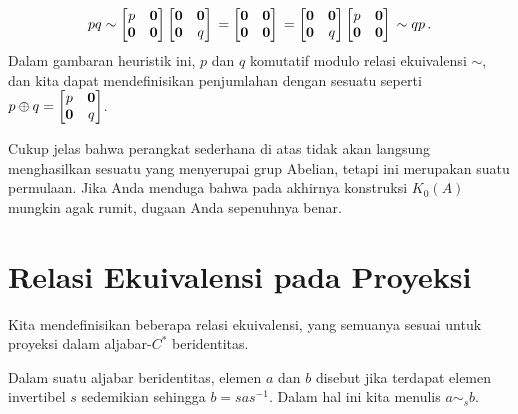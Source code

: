     \[ pq \sim \begin{bmatrix} p & \mathbf{0} \\ \mathbf{0} & \mathbf{0} \end{bmatrix} \begin{bmatrix} \mathbf{0} & \mathbf{0} \\ \mathbf{0} & q \end{bmatrix}  \\
                   = \begin{bmatrix} \mathbf{0} & \mathbf{0} \\ \mathbf{0} & \mathbf{0} \end{bmatrix}           \\
                   =  \begin{bmatrix} \mathbf{0} & \mathbf{0} \\ \mathbf{0} &  q \end{bmatrix}\begin{bmatrix} p & \mathbf{0} \\ \mathbf{0} & \mathbf{0} \end{bmatrix}  \\
                   \sim qp\,. \]
Dalam gambaran heuristik ini, $p$ dan $q$ komutatif modulo relasi ekuivalensi $\sim$, dan kita dapat mendefinisikan penjumlahan dengan sesuatu seperti
$p \oplus q = \begin{bmatrix} p & \mathbf{0} \\ \mathbf{0} & q \end{bmatrix}$.

Cukup jelas bahwa perangkat sederhana di atas tidak akan langsung menghasilkan sesuatu yang menyerupai grup Abelian, tetapi ini merupakan suatu permulaan. Jika Anda menduga
bahwa pada akhirnya konstruksi $K_0(A)$ mungkin agak rumit, dugaan Anda sepenuhnya benar.




\section{Relasi Ekuivalensi pada Proyeksi}

Kita mendefinisikan beberapa relasi ekuivalensi, yang semuanya sesuai untuk proyeksi dalam aljabar-$C^*$ beridentitas.

\begin{defn} Dalam suatu aljabar beridentitas, elemen $a$ dan $b$ disebut
 jika terdapat elemen invertibel $s$ sedemikian sehingga $b = sas^{-1}$.
Dalam hal ini kita menulis $a \sim_s b$.
\end{defn}

